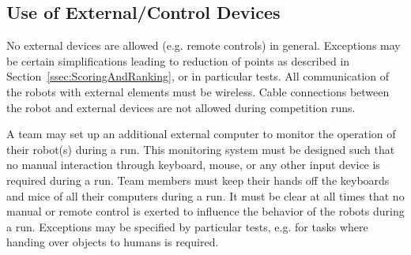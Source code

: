 \subsection{Use of External/Control Devices}
No external devices are allowed (e.g. remote controls) in general. Exceptions may be certain simplifications leading to reduction of points as described in Section~\ref{ssec:ScoringAndRanking}, or in particular tests. All communication of the robots with external elements must be wireless. Cable connections between the robot and external devices are not allowed during competition runs.
\par
A team may set up an additional external computer to monitor the operation of their robot(s) during a run. This monitoring system must be designed such that no manual interaction through keyboard, mouse, or any other input device is required during a run. Team members must keep their hands off the keyboards and mice of all their computers during a run.
It must be clear at all times that no manual or remote control is exerted to influence the behavior of the robots during a run. Exceptions may be specified by particular tests, e.g. for tasks where handing over objects to humans is required.


